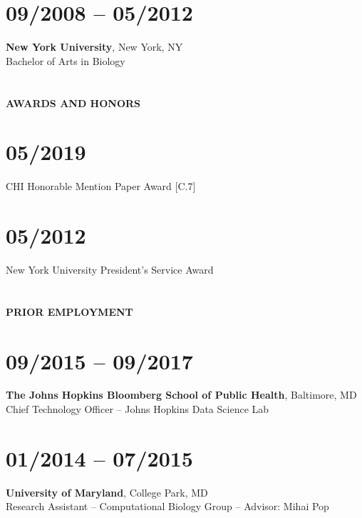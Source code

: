 \section{09/2008 -- 05/2012}

\textbf{New York University}, New York, NY \\
Bachelor of Arts in Biology

\section{} \vspace{0.1in} \textbf{AWARDS AND HONORS} \vspace{-0.05in}

\section{05/2019} CHI Honorable Mention Paper Award [C.7]

\section{05/2012} New York University President's Service Award


\section{} \vspace{0.1in} \textbf{PRIOR EMPLOYMENT} \vspace{-0.5em}

\section{09/2015 -- 09/2017}
\textbf{The Johns Hopkins Bloomberg School of Public Health}, Baltimore, MD \\
Chief Technology Officer -- Johns Hopkins Data Science Lab

\section{01/2014 -- 07/2015}
\textbf{University of Maryland}, College Park, MD \\
Research Assistant --  Computational Biology Group -- Advisor: Mihai Pop

